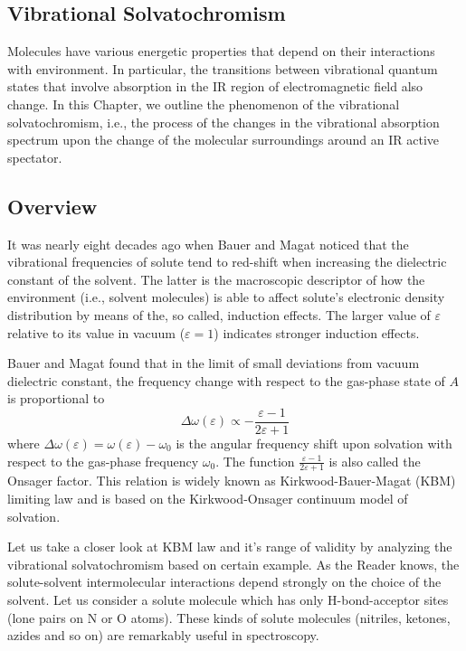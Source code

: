 \documentclass[a4paper,titlepage,twoside,fleqn,12pt]{book}
\begin{document}
\begin{refsection}
\chapter{Vibrational Solvatochromism}

Molecules have various energetic properties that 
depend on their interactions with environment. In particular,
the transitions between vibrational quantum states
that involve absorption in the IR region of 
electromagnetic field also change. 
In this Chapter, we outline the phenomenon 
of the vibrational solvatochromism, i.e., the process of
the changes in the vibrational absorption spectrum upon the change 
of the molecular surroundings around an IR active spectator.

\section{Overview}
%
It was nearly eight decades ago when Bauer and Magat noticed 
that the vibrational frequencies
of solute tend to red-shift when
increasing the dielectric constant of the solvent.\citep{Bauer.Magat.JPhysRadium.1938} 
The latter is the macroscopic descriptor 
of how the environment (i.e., solvent molecules) is able to affect solute's 
electronic density distribution by means of the, so called, induction
effects. The larger value of $\varepsilon$ relative to its value in vacuum
($\varepsilon=1$) indicates stronger induction effects. 

Bauer and Magat found that in the limit of small deviations
from vacuum dielectric constant, the frequency change with respect to the
gas-phase state of $A$ is proportional to
%
\begin{equation} \label{e:kbm}
\Delta \omega(\varepsilon) \propto - \frac{\varepsilon-1}{2\varepsilon+1}
\end{equation}
%
where $\Delta\omega(\varepsilon) = \omega(\varepsilon) - \omega_0$ is the
angular frequency shift upon solvation with respect to the gas-phase frequency
$\omega_0$. The function $\frac{\varepsilon-1}{2\varepsilon+1}$ is also called
the Onsager factor. This relation is widely known as Kirkwood-Bauer-Magat (KBM) 
limiting law and is based on the Kirkwood-Onsager continuum model of 
solvation.\citep{Kirkwood.JCP.1934,Onsager.JACS.1936}

Let us take a closer look at KBM law and it's range of validity by analyzing the vibrational
solvatochromism based on certain example. As the Reader knows, the solute\hyp{}solvent intermolecular interactions 
depend strongly on the choice of the solvent.\citep{Stone.TheTheoryOfIntermolecularForces.1996,Gutmann.Resch.Linert.CoordChemRev.1982} 
Let us consider a solute molecule which has
only H\hyp{}bond\hyp{}acceptor sites (lone pairs on N or O atoms). These kinds of solute molecules
(nitriles, ketones, azides and so on) are remarkably useful in spectroscopy.


\end{refsection}
\end{document}

